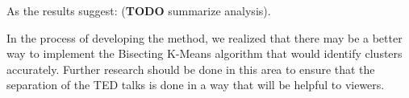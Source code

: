 \documentclass[letterpaper, 11pt]{article}
\begin{document}
As the results suggest: (\textbf{TODO} summarize analysis). 

In the process of developing the method, we realized that there may be a better way to implement the Bisecting K-Means algorithm that would identify clusters accurately. Further research should be done in this area to ensure that the separation of the TED talks is done in a way that will be helpful to viewers.



    
    
    
\end{document}
